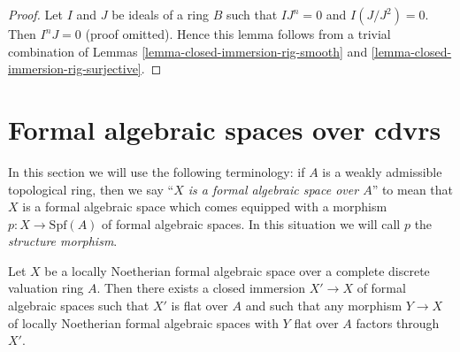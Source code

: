\begin{proof}
Let $I$ and $J$ be ideals of a ring $B$ such that $IJ^n = 0$ and
$I(J/J^2) = 0$. Then $I^nJ = 0$ (proof omitted).
Hence this lemma follows from a trivial combination of
Lemmas \ref{lemma-closed-immersion-rig-smooth} and
\ref{lemma-closed-immersion-rig-surjective}.
\end{proof}







\section{Formal algebraic spaces over cdvrs}
\label{section-over-cdrv}

\noindent
In this section we will use the following terminology:
if $A$ is a weakly admissible topological ring, then we
say ``{\it $X$ is a formal algebraic space over $A$}'' to mean that $X$
is a formal algebraic space which comes equipped with
a morphism $p : X \to \text{Spf}(A)$ of formal algebraic spaces.
In this situation we will call $p$ the {\it structure morphism}.

\begin{lemma}
\label{lemma-flat-locus}
Let $X$ be a locally Noetherian formal algebraic space over
a complete discrete valuation ring $A$.
Then there exists a closed immersion $X' \to X$
of formal algebraic spaces such that $X'$ is flat over $A$
and such that any morphism $Y \to X$ of locally Noetherian formal algebraic
spaces with $Y$ flat over $A$ factors through $X'$.
\end{lemma}

